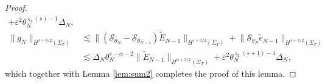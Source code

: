\documentclass[10pt,a4paper]{amsart}
\begin{document}
\begin{proof}
\begin{align*}
		+\varepsilon^2 \theta_N^{\varsigma_4(s)-1}\varDelta_N,\\[1mm]
		\big\|g_{{N}} \big\|_{H^{s+3/2}(\Sigma_{T})}
		&\lesssim \big\|(\mathcal{S}_{\theta_{{N}}}-\mathcal{S}_{\theta_{{N}-1}})\widetilde{E}_{{N}-1}\big\|_{H^{s+3/2}(\Sigma_{T})}
		+\big\|\mathcal{S}_{\theta_{{N}}}\tilde{e}_{{N}-1}\big\|_{H^{s+3/2}(\Sigma_{T})}\\
		&\lesssim
		\varDelta_{{N}}
		\theta_{{N}}^{s-{\alpha }-2}\big\|\widetilde{E}_{{N}-1}\big\|_{H^{\alpha+5/2}(\Sigma_{T})}
		+\varepsilon^2 \theta_N^{\varsigma_2(s+1)-1}\varDelta_N,
	\end{align*}
	which together with Lemma \ref{lem:sum2} completes the proof of this lemma.
\end{proof}
\end{document}
